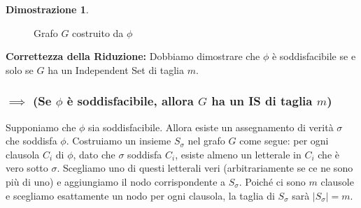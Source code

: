 \documentclass[a4paper, 11pt]{book} %
\theoremstyle{definition}
\newtheorem*{proof*}{Dimostrazione}
\begin{document}
\begin{proof*}
\begin{figure}[h]
    \caption{Grafo $G$ costruito da $\phi$}
    \label{fig:is_reduction_graph}
\end{figure}

\textbf{Correttezza della Riduzione:}
Dobbiamo dimostrare che $\phi$ è soddisfacibile se e solo se $G$ ha un Independent Set di taglia $m$.

\subsubsection{$\implies$ (Se $\phi$ è soddisfacibile, allora $G$ ha un IS di taglia $m$)}
Supponiamo che $\phi$ sia soddisfacibile. Allora esiste un assegnamento di verità $\sigma$ che soddisfa $\phi$.
Costruiamo un insieme $S_\sigma$ nel grafo $G$ come segue: per ogni clausola $C_i$ di $\phi$, dato che $\sigma$ soddisfa $C_i$, esiste almeno un letterale in $C_i$ che è vero sotto $\sigma$. Scegliamo uno di questi letterali veri (arbitrariamente se ce ne sono più di uno) e aggiungiamo il nodo corrispondente a $S_\sigma$.
Poiché ci sono $m$ clausole e scegliamo esattamente un nodo per ogni clausola, la taglia di $S_\sigma$ sarà $|S_\sigma|=m$.


\end{proof*}
\end{document}
